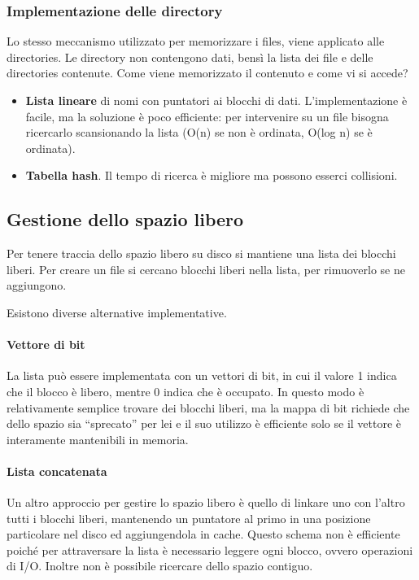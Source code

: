 \documentclass[a4paper]{article}
\begin{document}
\subsubsection{Implementazione delle directory}
Lo stesso meccanismo utilizzato per memorizzare i files, viene applicato alle directories. Le directory non contengono dati, bensì la lista dei file e delle directories contenute. Come viene memorizzato il contenuto e come vi si accede?
\begin{itemize}
   \item \textbf{Lista lineare} di nomi con puntatori ai blocchi di dati. L'implementazione è facile, ma la soluzione è poco efficiente: per intervenire su un file bisogna ricercarlo scansionando la lista (O(n) se non è ordinata, O(log n) se è ordinata).
   \item \textbf{Tabella hash}. Il tempo di ricerca è migliore ma possono esserci collisioni.
\end{itemize}

\subsection{Gestione dello spazio libero}

Per tenere traccia dello spazio libero su disco si mantiene una lista dei blocchi liberi. Per creare un file si cercano blocchi liberi nella lista, per rimuoverlo se ne aggiungono.

Esistono diverse alternative implementative.

\paragraph{Vettore di bit}
La lista può essere implementata con un vettori di bit, in cui il valore 1 indica che il blocco è libero, mentre 0 indica che è occupato. In questo modo è relativamente semplice trovare dei blocchi liberi, ma la mappa di bit richiede che dello spazio sia ``sprecato'' per lei e il suo utilizzo è efficiente solo se il vettore è interamente mantenibili in memoria.

\paragraph{Lista concatenata}
Un altro approccio per gestire lo spazio libero è quello di linkare uno con l'altro tutti i blocchi liberi, mantenendo un puntatore al primo in una posizione particolare nel disco ed aggiungendola in cache. Questo schema non è efficiente poiché per attraversare la lista è necessario leggere ogni blocco, ovvero operazioni di I/O. Inoltre non è possibile ricercare dello spazio contiguo.
\end{document}
